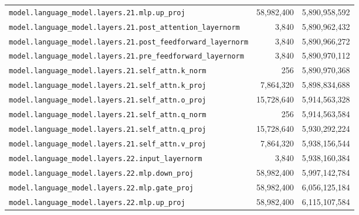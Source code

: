 \documentclass[10pt,a4paper]{article}
\theoremstyle{definition}
\begin{document}
\begin{appendices}
\begin{longtable}{p{9.5cm}rr}
\texttt{model.\allowbreak{}language\_model.\allowbreak{}layers.\allowbreak{}21.\allowbreak{}mlp.\allowbreak{}up\_proj} & 58,982,400 & 5,890,958,592 \\
\texttt{model.\allowbreak{}language\_model.\allowbreak{}layers.\allowbreak{}21.\allowbreak{}post\_attention\_layernorm} & 3,840 & 5,890,962,432 \\
\texttt{model.\allowbreak{}language\_model.\allowbreak{}layers.\allowbreak{}21.\allowbreak{}post\_feedforward\_layernorm} & 3,840 & 5,890,966,272 \\
\texttt{model.\allowbreak{}language\_model.\allowbreak{}layers.\allowbreak{}21.\allowbreak{}pre\_feedforward\_layernorm} & 3,840 & 5,890,970,112 \\
\texttt{model.\allowbreak{}language\_model.\allowbreak{}layers.\allowbreak{}21.\allowbreak{}self\_attn.\allowbreak{}k\_norm} & 256 & 5,890,970,368 \\
\texttt{model.\allowbreak{}language\_model.\allowbreak{}layers.\allowbreak{}21.\allowbreak{}self\_attn.\allowbreak{}k\_proj} & 7,864,320 & 5,898,834,688 \\
\texttt{model.\allowbreak{}language\_model.\allowbreak{}layers.\allowbreak{}21.\allowbreak{}self\_attn.\allowbreak{}o\_proj} & 15,728,640 & 5,914,563,328 \\
\texttt{model.\allowbreak{}language\_model.\allowbreak{}layers.\allowbreak{}21.\allowbreak{}self\_attn.\allowbreak{}q\_norm} & 256 & 5,914,563,584 \\
\texttt{model.\allowbreak{}language\_model.\allowbreak{}layers.\allowbreak{}21.\allowbreak{}self\_attn.\allowbreak{}q\_proj} & 15,728,640 & 5,930,292,224 \\
\texttt{model.\allowbreak{}language\_model.\allowbreak{}layers.\allowbreak{}21.\allowbreak{}self\_attn.\allowbreak{}v\_proj} & 7,864,320 & 5,938,156,544 \\
\texttt{model.\allowbreak{}language\_model.\allowbreak{}layers.\allowbreak{}22.\allowbreak{}input\_layernorm} & 3,840 & 5,938,160,384 \\
\texttt{model.\allowbreak{}language\_model.\allowbreak{}layers.\allowbreak{}22.\allowbreak{}mlp.\allowbreak{}down\_proj} & 58,982,400 & 5,997,142,784 \\
\texttt{model.\allowbreak{}language\_model.\allowbreak{}layers.\allowbreak{}22.\allowbreak{}mlp.\allowbreak{}gate\_proj} & 58,982,400 & 6,056,125,184 \\
\texttt{model.\allowbreak{}language\_model.\allowbreak{}layers.\allowbreak{}22.\allowbreak{}mlp.\allowbreak{}up\_proj} & 58,982,400 & 6,115,107,584 \\

\end{longtable}
\end{appendices}
\end{document}
